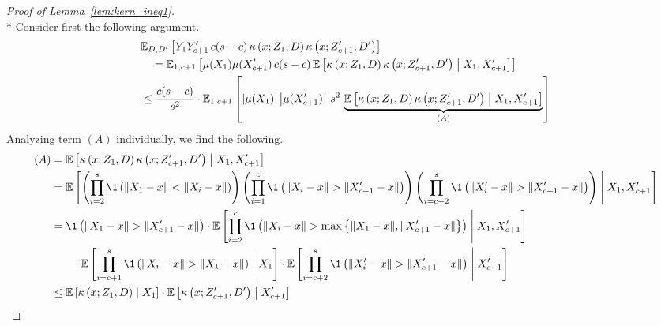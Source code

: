 \begin{proof}[Proof of Lemma~\ref{lem:kern_ineq1}]\mbox{}\\*
	Consider first the following argument.
	\begin{equation}
		\begin{aligned}
			& \mathbb{E}_{D, D^{\prime}}\left[Y_{1}Y_{c+1}^{\prime} \, c(s-c) \, \kappa\left(x; Z_{1}, D\right)\kappa\left(x; Z_{c+1}^{\prime}, D^{\prime}\right)\right]\\
			& \quad = \mathbb{E}_{1, c+1}\left[\mu(X_1) \mu(X_{c+1}^{\prime}) \, c(s-c) \, 
			\mathbb{E}\left[\kappa\left(x; Z_{1}, D\right)\kappa\left(x; Z_{c+1}^{\prime}, D^{\prime}\right) \; \middle| \; X_1, X_{c+1}^{\prime}\right]\right]\\
			& \leq \frac{c(s-c)}{s^2} \cdot \mathbb{E}_{1, c+1}\left[\left|\mu(X_1)\right| \left|\mu(X_{c+1}^{\prime})\right| \, s^2 \, 
			\underbrace{\mathbb{E}\left[\kappa\left(x; Z_{1}, D\right)\kappa\left(x; Z_{c+1}^{\prime}, D^{\prime}\right) \; \middle| \; X_1, X_{c+1}^{\prime}\right]}_{(A)}\right]\\
		\end{aligned}
	\end{equation}
	Analyzing term $(A)$ individually, we find the following.
	\begin{equation}
		\begin{aligned}
			(A) 
			& = \E\left[\kappa\left(x; Z_{1}, D\right)\kappa\left(x; Z_{c+1}^{\prime}, D^{\prime}\right) \; \middle| \; X_1, X_{c+1}^{\prime}\right] \\
			& = \E\left[\left(\prod_{i = 2}^{s}\1\left(\|X_1 - x\| < \|X_{i} - x\|\right)\right)
			\left(\prod_{i = 1}^{c}\1\left(\|X_i - x\| > \|X_{c+1}^{\prime} - x\|\right)\right) 
			\left(\prod_{i = c+2}^{s}\1\left(\|X_i^{\prime} - x\| > \|X_{c+1}^{\prime} - x\|\right)\right) \; \middle| \; X_1, X_{c+1}^{\prime}\right]\\
			& = \1\left(\|X_1 - x\| > \|X_{c+1}^{\prime} - x\|\right) \cdot \E\left[\prod_{i = 2}^{c}\1\left(\|X_{i} - x\| > \max\left\{\|X_{1} - x\|, \|X_{c+1}^{\prime} - x\|\right\}\right) \; \middle| \; X_1, X_{c+1}^{\prime}\right]\\
			& \quad \quad  \cdot \E\left[\prod_{i = c+1}^{s}\1\left(\|X_i - x\| > \|X_{1} - x\|\right) \; \middle| \; X_{1}\right]
			\cdot \E\left[\prod_{i = c+2}^{s}\1\left(\|X_i^{\prime} - x\| > \|X_{c+1}^{\prime} - x\|\right) \; \middle| \; X_{c+1}^{\prime}\right]\\
			& \leq \E\left[\kappa\left(x; Z_{1}, D\right) \; \middle| \; X_1\right] 
			\cdot \E\left[\kappa\left(x; Z_{c+1}^{\prime}, D^{\prime}\right) \; \middle| \; X_{c+1}^{\prime}\right]

\end{aligned}
\end{equation}
\end{proof}
